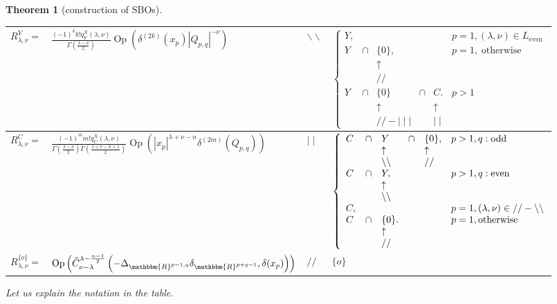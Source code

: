 \documentclass[12pt]{article} %
\newcommand{\tmop}[1]{\ensuremath{\operatorname{#1}}}
\newtheorem{theorem}{Theorem}
\theoremstyle{definition}
\theoremstyle{exampstyle} \newtheorem{examp}[theorem]{Theorem}
\renewcommand{\Q}{Q_{p,q}}
\newcommand{\bb}{\backslash\backslash}
\begin{document}
\begin{theorem}[construction of SBOs]
\begin{tabular}{@{}|@{}l@{}|@{}l@{}|l@{}|@{}l@{}|}
  \hline
  $R_{\lambda, \nu}^Y =$ & $\frac{(-1)^k k! q_Y^X (\lambda, \nu)}{\Gamma \left( \frac{\lambda - \nu}{2}
  \right) }{\tmop{Op} \left( \delta^{(2k)}(x_p)
  | \Q |^{- \nu}  \right)}$ & $
  \backslash\backslash$ & 
$\left\{\begin{array}{llllll}
  Y, &  &  &  &  & p = 1, (\lambda, \nu) \in L_{\tmop{even}}\\
  Y & \cap & \{ 0 \}, &  &  & p = 1, \tmop{otherwise}\\
  &  & \uparrow &  &  & \\
  &  & / / &  &  & \\
  Y & \cap & \{ 0 \} & \cap & C. & p > 1\\
  &  & \uparrow &  & \uparrow & \\
  &  & / / - \mid \mid \mid &  & \mid \mid & 
\end{array}\right.$
\\
  \hline
  $R_{\lambda, \nu}^C =$ & $\frac{(-1)^m m! q_C^X (\lambda, \nu)}{\Gamma \left( \frac{\lambda - \nu}{2}
  \right) \Gamma \left( \frac{\lambda + \nu - n + 1}{2} \right) }{\tmop{Op} \left( | x_p |^{\lambda + \nu - n}\delta^{(2m)}\left( \Q \right)
    \right)}$ & $ \mid \mid$ &
    $\left\{\begin{array}{llllll@{}}
  C & \cap & Y & \cap & \{ 0 \}, & p > 1, q : \tmop{odd}\\
  &  & \uparrow &  & \uparrow & \\
  &  & \backslash\backslash &  & / / & \\
  C & \cap & Y, &  &  & p > 1, q : \tmop{even}\\
  &  & \uparrow &  &  & \\
  &  & \backslash\backslash &  &  & \\
  C, &  &  &  &  & p = 1, (\lambda, \nu) \in / / - \bb
  \\
  C & \cap & \{ 0 \}. &  &  & p = 1, \tmop{otherwise}\\
  &  & \uparrow &  &  & \\
  &  & / / &  &  & 
\end{array}\right.$
\\
  \hline
  $R_{\lambda, \nu}^{\{ o \}} =$ & 
  $\tmop{Op} \left( \tilde{C}_{\nu -
  \lambda}^{\lambda - \frac{n - 1}{2}} \left(-\Delta_{\mathbbm{R}^{p - 1, q}}
  \delta_{\mathbbm{R}^{p + q - 1}}, \delta (x_p)\right) \right)
  $ & $
  / /$ & $\{ o \}$\\
  \hline
\end{tabular}
Let us explain the notation in the table.
\begin{itemize}

\end{itemize}
\end{theorem}
\end{document}
